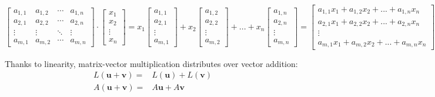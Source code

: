 \documentclass{article}
\begin{document}
\[\begin{bmatrix} 
a_{1,1} & a_{1,2} & \cdots & a_{1,n} \\
a_{2,1} & a_{2,2} & \cdots & a_{2,n} \\
\vdots & \vdots & \ddots & \vdots \\
a_{m,1} & a_{m,2} & \cdots & a_{m,n} 
\end{bmatrix} \cdot \begin{bmatrix} 
x_1 \\ x_2 \\ \vdots \\ x_n
\end{bmatrix} = x_1 \begin{bmatrix} a_{1,1} \\ a_{2,1} \\ \vdots \\ a_{m,1} \end{bmatrix} + x_2 \begin{bmatrix} a_{1,2} \\ a_{2,2} \\ \vdots \\ a_{m,2} \end{bmatrix} + ... + x_n \begin{bmatrix} a_{1,n} \\ a_{2,n} \\ \vdots \\ a_{m,n} \end{bmatrix} = \begin{bmatrix} 
a_{1,1}x_1 + a_{1,2}x_2 + ... + a_{1,n}x_n \\
a_{2,1}x_1 + a_{2,2}x_2 + ... + a_{2,n}x_n \\
\vdots \\
a_{m,1}x_1 + a_{m,2}x_2 + ... + a_{m,n}x_n 
\end{bmatrix}\]

Thanks to linearity, matrix-vector multiplication distributes over vector addition:
\begin{align*}
L(\mathbf{u} + \mathbf{v}) = & L(\mathbf{u}) + L(\mathbf{v}) \\
A(\mathbf{u} + \mathbf{v}) = & A\mathbf{u} + A\mathbf{v} 
\end{align*} 
\end{document}
